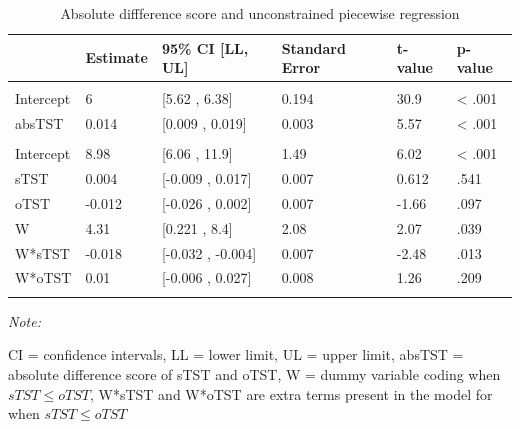 \documentclass[
]{article}
\begin{document}
\begin{table}[!h]
\centering
\caption{\label{tab:absolutereg}Absolute diffference score and unconstrained piecewise regression}
\centering
\fontsize{10}{12}\selectfont
\begin{threeparttable}
\begin{tabular}[t]{llllll}
\toprule
  & Estimate & 95\% CI [LL, UL] & Standard Error & t-value & p-value\\
\midrule
\addlinespace[0.3em]
\multicolumn{6}{l}{\textbf{Absolute difference model}}\\
\hspace{1em}Intercept & 6 & {}[5.62 , 6.38] & 0.194 & 30.9 & < .001\\
\addlinespace
\hspace{1em}absTST & 0.014 & {}[0.009 , 0.019] & 0.003 & 5.57 & < .001\\
\addlinespace
\addlinespace[0.3em]
\multicolumn{6}{l}{\textbf{Unconstrained piecewise model}}\\
\hspace{1em}Intercept & 8.98 & {}[6.06 , 11.9] & 1.49 & 6.02 & < .001\\
\addlinespace
\hspace{1em}sTST & 0.004 & {}[-0.009 , 0.017] & 0.007 & 0.612 & .541\\
\addlinespace
\hspace{1em}oTST & -0.012 & {}[-0.026 , 0.002] & 0.007 & -1.66 & .097\\
\addlinespace
\hspace{1em}W & 4.31 & {}[0.221 , 8.4] & 2.08 & 2.07 & .039\\
\addlinespace
\hspace{1em}W*sTST & -0.018 & {}[-0.032 , -0.004] & 0.007 & -2.48 & .013\\
\addlinespace
\hspace{1em}W*oTST & 0.01 & {}[-0.006 , 0.027] & 0.008 & 1.26 & .209\\
\addlinespace
\bottomrule
\end{tabular}
\begin{tablenotes}[para]
\item \textit{Note: } 
\item CI = confidence intervals, LL = lower limit, UL = upper limit, absTST = absolute difference score of sTST and oTST, W = dummy variable coding when $sTST \le oTST$, W*sTST and W*oTST are extra terms present in the model for when $sTST \le oTST$
\end{tablenotes}
\end{threeparttable}
\end{table}
\end{document}
